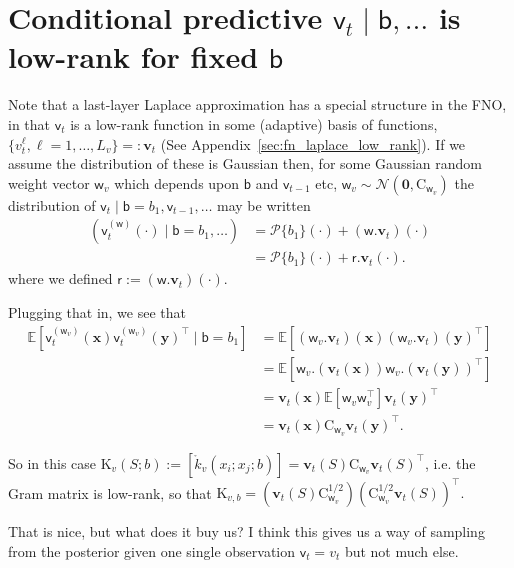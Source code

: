 \documentclass{article}
\newcommand{\vv}[1]{\boldsymbol{#1}}
\newcommand{\mm}[1]{\mathrm{#1}}
\newcommand{\rv}[1]{\mathsf{#1}}
\newcommand{\vrv}[1]{\vv{\rv{#1}}}
\newcommand{\dist}[1]{\mathcal{#1}}
\newcommand{\set}[1]{#1}
\newcommand{\op}[1]{\mathscr{#1}}
\newcommand{\gvn}{\mid}
\newcommand{\Ex}{\mathbb{E}}
\newcommand{\lat}{\rv{b}}   %
\newcommand{\latst}{b}      %
\begin{document}
\section{Conditional predictive \(\rv{v}_t\gvn\lat,\dots\) is low-rank for fixed \(\lat\)}

Note that a last-layer Laplace approximation has a special structure in the FNO, in that \(\rv{v}_{t}\) is a low-rank function in some (adaptive) basis of functions, \(\{v_{t}^\ell,\ell=1,\dots,L_v\}=:\vv{v}_{t}\) (See Appendix~\ref{sec:fn_laplace_low_rank}).
If we assume the distribution of these is Gaussian then, for some Gaussian random weight vector \(\vrv{w}_{v}\) which depends upon \(\lat\) and \(\rv{v}_{t-1}\) etc, \(\vrv{w}_{v} \sim \dist{N}\left(\vv{0}, \mm{C}_{\vrv{w}_{v}}\right)\) the  distribution of  \(\rv{v}_{t}\gvn \lat{=}\latst_{1},\rv{v}_{t-1},\dots\) may be written
\begin{align*}
  \left(\rv{v}_{t}^{(\vrv{w})}(\cdot) \gvn \lat{=}\latst_{1},\dots\right)
  &= \op{P}\{\latst_1\}(\cdot) +(\vrv{w}.\vv{v}_{t})(\cdot)\\
  &= \op{P}\{\latst_1\}(\cdot) +\rv{r}.\vv{v}_{t}(\cdot).
\end{align*}
where we defined \(\rv{r}:=(\vrv{w}.\vv{v}_{t})(\cdot).\)

Plugging that in, we see that 
\begin{align*}
  \Ex\left[ \rv{v}_{t}^{(\vrv{w}_{v})}(\vv{x})\rv{v}_{t}^{(\vrv{w}_{v})}(\vv{y})^{\top}\gvn \lat{=}\latst_{1}\right]
  &= \Ex \left[(\vrv{w}_{v}.\vv{v}_{t})(\vv{x})(\vrv{w}_{v}.\vv{v}_{t})(\vv{y})^{\top}\right]\\
  &= \Ex \left[\vrv{w}_{v}.(\vv{v}_{t}(\vv{x}))\vrv{w}_{v}.(\vv{v}_{t}(\vv{y}))^{\top}\right]\\
  &= \vv{v}_{t}(\vv{x})\Ex \left[\vrv{w}_{v}\vrv{w}_{v}^{\top}\right]\vv{v}_{t}(\vv{y})^{\top}\\
  &= \vv{v}_{t}(\vv{x})\mm{C}_{\vrv{w}_{v}}\vv{v}_{t}(\vv{y})^{\top}.
\end{align*}

So in this case \(\mm{K}_{v}(\set{S};\latst):=[\mathring{k}_{v}(x_{i};x_{j};\latst)]=\vv{v}_{t}(\set{S})\mm{C}_{\vrv{w}_{v}}\vv{v}_{t}(\set{S})^{\top}\), i.e. the Gram matrix is low-rank, so that
\(\mm{K}_{v,\latst}=(\vv{v}_{t}(\set{S})\mm{C}_{\vrv{w}_{v}}^{1/2})(\mm{C}_{\vrv{w}_{v}}^{1/2}\vv{v}_{t}(\set{S}))^{\top}.\)

That is nice, but what does it buy us?
I think this gives us a way of sampling from the posterior given one single observation \(\rv{v}_{t}=v_t\) but not much else.
\end{document}
